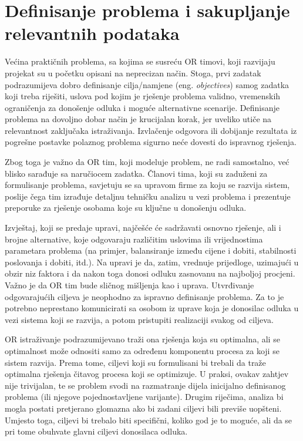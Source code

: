 \documentclass[a4paper, utf8, 11pt, colorlinks]{book}
\theoremstyle{definition}
\begin{document}
 \section{Definisanje problema i sakupljanje relevantnih podataka}
 
Većina praktičnih problema, sa kojima se susreću OR timovi, koji razvijaju projekat su u početku opisani na neprecizan način. Stoga, prvi zadatak podrazumijeva dobro definisanje  cilja/namjene  (eng. \emph{objectives}) samog zadatka koji treba riješiti, uslova pod kojim je rješenje problema validno,  vremenskih ograničenja za donošenje odluka i moguće alternativne scenarije.  Definisanje problema na dovoljno dobar način je krucijalan korak, jer uveliko utiče na relevantnost zaključaka istraživanja. Izvlačenje odgovora ili dobijanje rezultata iz pogrešne postavke polaznog problema sigurno neće dovesti do ispravnog rješenja.  

Zbog toga je važno da OR tim, koji   modeluje problem,  ne radi samostalno, već blisko sarađuje sa naručiocem zadatka. Članovi tima, koji su zaduženi za formulisanje problema, savjetuju se sa upravom firme za koju se razvija sistem, poslije čega tim izrađuje detaljnu tehničku analizu u vezi problema i prezentuje preporuke za rješenje  osobama koje su ključne u donošenju odluka.   


Izvještaj, koji se predaje upravi, najčešće će sadržavati osnovno rješenje, ali i brojne alternative, koje odgovaraju različitim uslovima ili  vrijednostima parametara problema  (na primjer, balansiranje između cijene i dobiti, stabilnosti poslovanja i dobiti, itd.). Na upravi je da, zatim, vrednuje prijedloge, uzimajući u obzir  niz faktora i da nakon toga donosi odluku zasnovanu na najboljoj procjeni. Važno je da OR tim bude sličnog mišljenja kao i uprava. Utvrđivanje odgovarajućih ciljeva je  neophodno za ispravno definisanje problema.  Za to je potrebno neprestano komunicirati sa osobom iz uprave koja je donosilac odluka u vezi sistema koji se razvija, a potom pristupiti  realizaciji svakog od ciljeva.

OR istraživanje podrazumijevano traži ona rješenja koja su optimalna, ali se optimalnost može odnositi samo za određenu komponentu procesa za koji se sistem razvija. Prema tome, ciljevi koji su formulisani bi trebali da traže optimalna rješenja čitavog procesa koji se optimizuje.  U praksi, ovakav zahtjev nije trivijalan, te se problem svodi na razmatranje dijela inicijalno definisanog problema (ili njegove pojednostavljene varijante). Drugim riječima, analiza bi mogla postati pretjerano glomazna ako bi zadani ciljevi bili previše uopšteni. Umjesto toga, ciljevi bi trebalo biti specifični, koliko god je to moguće, ali da se pri tome obuhvate glavni ciljevi donosilaca odluka. 
\end{document}
